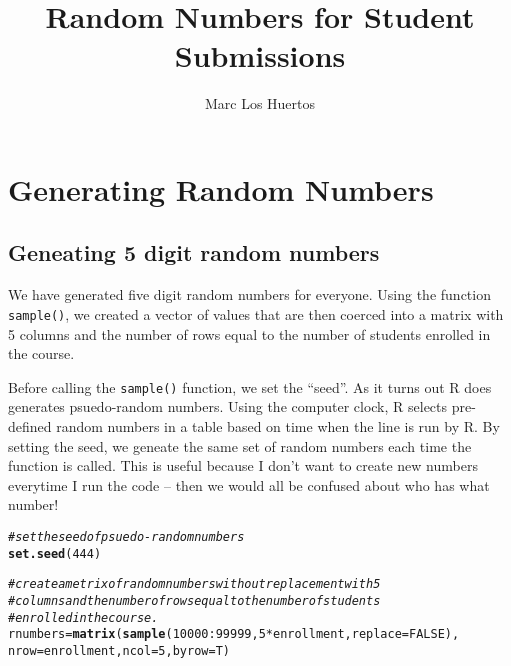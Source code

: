 \documentclass{article}\usepackage[]{graphicx}\usepackage[]{xcolor}
\title{Random Numbers for Student Submissions}
\author{Marc Los Huertos}
\makeatletter
\newcommand{\hlnum}[1]{\textcolor[rgb]{0.686,0.059,0.569}{#1}}%
\newcommand{\hlcom}[1]{\textcolor[rgb]{0.678,0.584,0.686}{\textit{#1}}}%
\newcommand{\hlopt}[1]{\textcolor[rgb]{0,0,0}{#1}}%
\newcommand{\hlstd}[1]{\textcolor[rgb]{0.345,0.345,0.345}{#1}}%
\newcommand{\hlkwb}[1]{\textcolor[rgb]{0.69,0.353,0.396}{#1}}%
\newcommand{\hlkwc}[1]{\textcolor[rgb]{0.333,0.667,0.333}{#1}}%
\newcommand{\hlkwd}[1]{\textcolor[rgb]{0.737,0.353,0.396}{\textbf{#1}}}%
\newenvironment{kframe}{%
 \def\at@end@of@kframe{}%
 \ifinner\ifhmode%
  \def\at@end@of@kframe{\end{minipage}}%
  \begin{minipage}{\columnwidth}%
 \fi\fi%
 \def\FrameCommand##1{\hskip\@totalleftmargin \hskip-\fboxsep
 \colorbox{shadecolor}{##1}\hskip-\fboxsep
     \hskip-\linewidth \hskip-\@totalleftmargin \hskip\columnwidth}%
 \MakeFramed {\advance\hsize-\width
   \@totalleftmargin\z@ \linewidth\hsize
   \@setminipage}}%
 {\par\unskip\endMakeFramed%
 \at@end@of@kframe}
\newenvironment{knitrout}{}{} %
\makeatother
\begin{document}
\maketitle
\begin{knitrout}
\color{fgcolor}\begin{kframe}


{\ttfamily\noindent\color{warningcolor}{\#\# Warning: package 'xtable' was built under R version 4.2.2}}\end{kframe}
\end{knitrout}

\section*{Generating Random Numbers}

\subsection*{Geneating 5 digit random numbers}

We have generated five digit random numbers for everyone. Using the function \texttt{sample()}, we created a vector of values that are then coerced into a matrix with 5 columns and the number of rows equal to the number of students enrolled in the course. 

Before calling the \texttt{sample()} function, we set the ``seed''. As it turns out R does generates psuedo-random numbers. Using the computer clock, R selects pre-defined random numbers in a table based on time when the line is run by R. By setting the seed, we geneate the same set of random numbers each time the function is called. This is useful because I don't want to create new numbers everytime I run the code -- then we would all be confused about who has what number!

\begin{knitrout}
\color{fgcolor}\begin{kframe}
\begin{alltt}
\hlcom{# set the seed of psuedo-random numbers}
\hlkwd{set.seed}\hlstd{(}\hlnum{444}\hlstd{)}

\hlcom{# create a metrix of random numbers without replacement with 5 }
\hlcom{# columns and the number of rows equal to the number of students }
\hlcom{# enrolled in the course.}
\hlstd{rnumbers} \hlkwb{=} \hlkwd{matrix}\hlstd{(}\hlkwd{sample}\hlstd{(}\hlnum{10000}\hlopt{:}\hlnum{99999}\hlstd{,} \hlnum{5}\hlopt{*} \hlstd{enrollment,} \hlkwc{replace}\hlstd{=} \hlnum{FALSE}\hlstd{),}
          \hlkwc{nrow}\hlstd{=enrollment,} \hlkwc{ncol}\hlstd{=}\hlnum{5}\hlstd{,} \hlkwc{byrow}\hlstd{=T)}
\end{alltt}
\end{kframe}
\end{knitrout}
\end{document}

